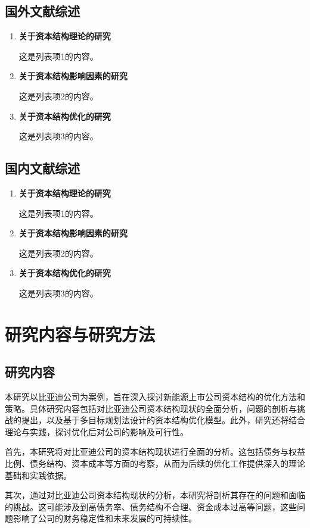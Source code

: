 \subsection{国外文献综述}

\begin{enumerate}[label=(\arabic*)]
\item \textbf{关于资本结构理论的研究 }

    这是列表项1的内容。
\item \textbf{关于资本结构影响因素的研究}

    这是列表项2的内容。
\item \textbf{关于资本结构优化的研究}

    这是列表项3的内容。
\end{enumerate}

\subsection{国内文献综述}

\begin{enumerate}[label=(\arabic*)]
\item \textbf{关于资本结构理论的研究 }

    这是列表项1的内容。
\item \textbf{关于资本结构影响因素的研究}

    这是列表项2的内容。
\item \textbf{关于资本结构优化的研究}

    这是列表项3的内容。
\end{enumerate}

\section{研究内容与研究方法}
\subsection{研究内容}
本研究以比亚迪公司为案例，旨在深入探讨新能源上市公司资本结构的优化方法和策略。具体研究内容包括对比亚迪公司资本结构现状的全面分析，问题的剖析与挑战的提出，以及基于多目标规划法设计的资本结构优化模型。此外，研究还将结合理论与实践，探讨优化后对公司的影响及可行性。

首先，本研究将对比亚迪公司的资本结构现状进行全面的分析。这包括债务与权益比例、债务结构、资本成本等方面的考察，从而为后续的优化工作提供深入的理论基础和实践依据。

其次，通过对比亚迪公司资本结构现状的分析，本研究将剖析其存在的问题和面临的挑战。这可能涉及到高债务率、债务结构不合理、资金成本过高等问题，这些问题影响了公司的财务稳定性和未来发展的可持续性。

